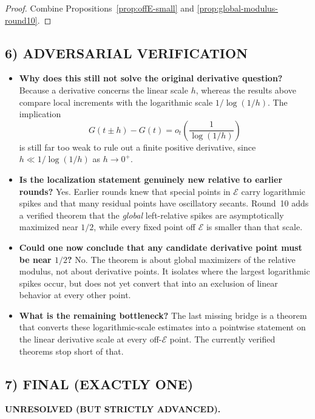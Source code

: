 \begin{proof}
Combine Propositions~\ref{prop:offE-small} and \ref{prop:global-modulus-round10}.
\end{proof}

\subsection{6) ADVERSARIAL VERIFICATION}

\begin{itemize}
\item \textbf{Why does this still not solve the original derivative question?}
Because a derivative concerns the linear scale $h$, whereas the results above compare local increments with the logarithmic scale $1/\log(1/h)$. The implication
\[
G(t\pm h)-G(t)=o_t\!\left(\frac1{\log(1/h)}\right)
\]
is still far too weak to rule out a finite positive derivative, since $h\ll 1/\log(1/h)$ as $h\to0^+$.

\item \textbf{Is the localization statement genuinely new relative to earlier rounds?}
Yes. Earlier rounds knew that special points in $\mathcal E$ carry logarithmic spikes and that many residual points have oscillatory secants. Round~10 adds a verified theorem that the \emph{global} left-relative spikes are asymptotically maximized near $1/2$, while every fixed point off $\mathcal E$ is smaller than that scale.

\item \textbf{Could one now conclude that any candidate derivative point must be near $1/2$?}
No. The theorem is about global maximizers of the relative modulus, not about derivative points. It isolates where the largest logarithmic spikes occur, but does not yet convert that into an exclusion of linear behavior at every other point.

\item \textbf{What is the remaining bottleneck?}
The last missing bridge is a theorem that converts these logarithmic-scale estimates into a pointwise statement on the linear derivative scale at every off-$\mathcal E$ point. The currently verified theorems stop short of that.
\end{itemize}

\subsection{7) FINAL (EXACTLY ONE)}

\textbf{UNRESOLVED (BUT STRICTLY ADVANCED).}

